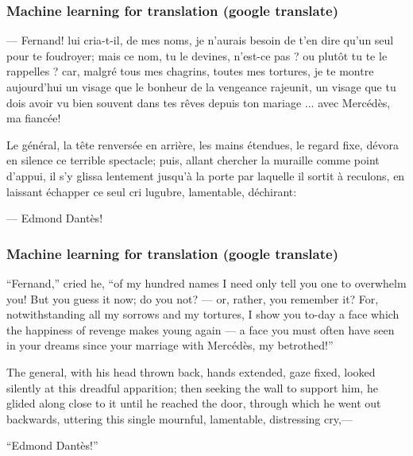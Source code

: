 \documentclass{beamer}
\begin{document}
\begin{frame}
  \frametitle{Machine learning for translation (google translate)}

  --- Fernand! lui cria-t-il, de mes noms, je n'aurais besoin de t'en
  dire qu'un seul pour te foudroyer; mais ce nom, tu le devines,
  n'est-ce pas ? ou plutôt tu te le rappelles ? car, malgré tous mes
  chagrins, toutes mes tortures, je te montre aujourd'hui un visage
  que le bonheur de la vengeance rajeunit, un visage que tu dois avoir
  vu bien souvent dans tes rêves depuis ton mariage ... avec Mercédès,
  ma fiancée!

  Le général, la tête renversée en arrière, les mains étendues, le
  regard fixe, dévora en silence ce terrible spectacle; puis, allant
  chercher la muraille comme point d'appui, il s'y glissa lentement
  jusqu'à la porte par laquelle il sortit à reculons, en laissant
  échapper ce seul cri lugubre, lamentable, déchirant:

  --- Edmond Dantès!

\end{frame}

\begin{frame}
  \frametitle{Machine learning for translation (google translate)}
  
  ``Fernand,'' cried he, ``of my hundred names I need only tell you
  one to overwhelm you! But you guess it now; do you not? --- or,
  rather, you remember it? For, notwithstanding all my sorrows and my
  tortures, I show you to-day a face which the happiness of revenge
  makes young again --- a face you must often have seen in your dreams
  since your marriage with Mercédès, my betrothed!''
  
  The general, with his head thrown back, hands extended, gaze fixed,
  looked silently at this dreadful apparition; then seeking the wall
  to support him, he glided along close to it until he reached the
  door, through which he went out backwards, uttering this single
  mournful, lamentable, distressing cry,---
  
  ``Edmond Dantès!''

\end{frame}
\end{document}
